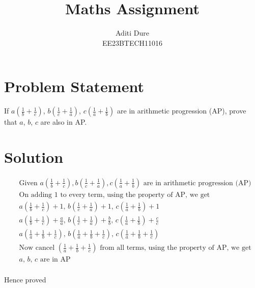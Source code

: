 \documentclass[12pt]{article}
\begin{document}
\title{Maths Assignment}
\author{Aditi Dure \\
        EE23BTECH11016}
\maketitle
\section*{Problem Statement}
If $a\left(\frac{1}{b} + \frac{1}{c}\right)$, $b\left(\frac{1}{c} + \frac{1}{a}\right)$, $c\left(\frac{1}{a} + \frac{1}{b}\right)$ are in arithmetic progression (AP), prove that $a$, $b$, $c$ are also in AP.

\section*{Solution}
\begin{align*}
&\text{Given } a\left(\frac{1}{b} + \frac{1}{c}\right), b\left(\frac{1}{c} + \frac{1}{a}\right), c\left(\frac{1}{a} + \frac{1}{b}\right) \text{ are in arithmetic progression (AP)} \\
&\text{On adding 1 to every term, using the property of AP, we get} \\
&a\left(\frac{1}{b} + \frac{1}{c}\right) + 1, \, b\left(\frac{1}{c} + \frac{1}{a}\right) + 1, \, c\left(\frac{1}{a} + \frac{1}{b}\right) + 1 \\
&a\left(\frac{1}{b} + \frac{1}{c}\right) + \frac{a}{a}, \, b\left(\frac{1}{c} + \frac{1}{a}\right) + \frac{b}{b}, \, c\left(\frac{1}{a} + \frac{1}{b}\right) + \frac{c}{c} \\
&a\left(\frac{1}{a} + \frac{1}{b} + \frac{1}{c}\right), \, b\left(\frac{1}{a} + \frac{1}{b} + \frac{1}{c}\right), \, c\left(\frac{1}{a} + \frac{1}{b} + \frac{1}{c}\right) \\
&\text{Now cancel } \left(\frac{1}{a} + \frac{1}{b} + \frac{1}{c}\right) \text{ from all terms, using the property of AP, we get} \\
&a, \, b, \, c \text{ are in AP}
\end{align*}
\\Hence proved
\end{document}
